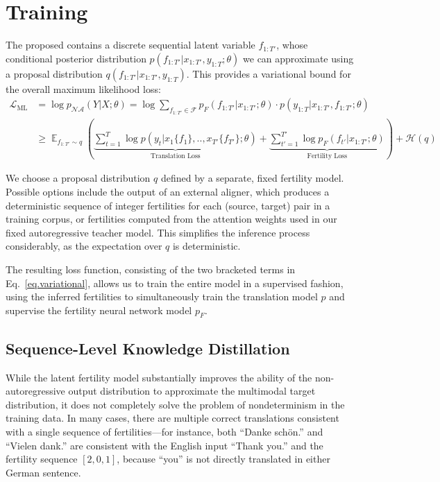 \section{Training}
The proposed \model{} contains a discrete sequential latent variable $f_{1:T'}$, whose conditional posterior distribution $p(f_{1:T'} | x_{1:T'}, y_{1:T}; \theta)$ we can approximate using a proposal distribution $q(f_{1:T'} | x_{1:T'}, y_{1:T})$. This provides a variational bound for the overall maximum likelihood loss:
\begin{equation}
\label{eq.variational}
\begin{split}
\mathcal{L}_{\text{ML}} &= \log p_{\mathcal{NA}}(Y|X; \theta) = \log \sum_{f_{1:T'}\in \mathcal{F}}{p_F(f_{1:T'}|x_{1:T'}; \theta)\cdot p(y_{1:T} | x_{1:T'}, f_{1:T'}; \theta)} \\
&\geq \mathop{\mathbb{E}}_{f_{1:T'} \sim q}\left(\underbrace{\sum_{t=1}^T\log p(y_t| x_1\{f_1\}, .., x_{T'}\{f_{T'}\}; \theta)}_{\text{Translation Loss}} + \underbrace{\sum_{t'=1}^{T'}\log p_F(f_{t'}|x_{1:T'}; \theta)}_{\text{Fertility Loss}} \right) + \mathcal{H}(q)
\end{split}
\end{equation}

We choose a proposal distribution $q$ defined by a separate, fixed fertility model. Possible options include the output of an external aligner, which produces a deterministic sequence of integer fertilities for each (source, target) pair in a training corpus, or fertilities computed from the attention weights used in our fixed autoregressive teacher model. This simplifies the inference process considerably, as the expectation over $q$ is deterministic.

The resulting loss function, consisting of the two bracketed terms in Eq.~\ref{eq.variational}, allows us to train the entire model in a supervised fashion, using the inferred fertilities to simultaneously train the translation model $p$ and supervise the fertility neural network model $p_F$.

\subsection{Sequence-Level Knowledge Distillation}\label{sec.seqkd}

While the latent fertility model substantially improves the ability of the non-autoregressive output distribution to approximate the multimodal target distribution, it does not completely solve the problem of nondeterminism in the training data. In many cases, there are multiple correct translations consistent with a single sequence of fertilities---for instance, both ``Danke sch\"{o}n.'' and ``Vielen dank.'' are consistent with the English input ``Thank you.'' and the fertility sequence $[2, 0, 1]$, because ``you'' is not directly translated in either German sentence.

